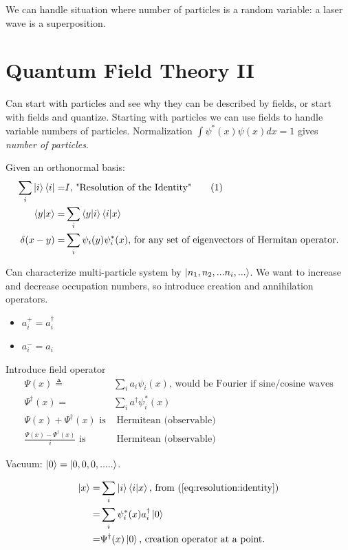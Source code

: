 \documentclass[]{article}
\newcommand\numberthis{\addtocounter{equation}{1}\tag{\theequation}}
\begin{document}
We can handle situation where number of particles is a random variable: a laser wave is a superposition.

\section{Quantum Field Theory II}

Can start with particles and see why they can be described by fields, or start with fields and quantize. Starting with particles we can use fields to handle variable numbers of particles. Normalization $\int \psi^*(x) \psi(x) dx=1$ gives \textit{number of particles}.

Given an orthonormal basis:
\begin{align*}
\sum_{i} \ket{i} \bra{i} =& I \text{, "Resolution of the Identity"}\numberthis \label{eq:resolution:identity}\\
\braket{y|x}=& \sum_{i} \braket{y|i} \braket{i|x}\\
\delta(x-y)=& \sum_{i} \psi_i(y) \psi^*_i(x)\text{, for any set of eigenvectors of Hermitan operator.}
\end{align*}

Can characterize multi-particle system by $\ket{n_1, n_2,...n_i,...}$. We want to increase and decrease occupation numbers, so introduce creation and annihilation operators.

\begin{itemize}
	\item $a^+_i=a^\dagger_i$
	\item $a^-_i=a_i$
\end{itemize} 

Introduce field operator
\begin{align*}
\Psi(x) \triangleq & \sum_{i} a_i \psi_i(x) \text{, would be Fourier if sine/cosine waves}\\
\Psi^\dagger(x) =& \sum_{i} a^\dagger \psi^*_i(x)\\
\Psi(x) + \Psi^\dagger(x) \text{ is}& \text{ Hermitean (observable)}\\
\frac{\Psi(x) - \Psi^\dagger(x)}{i} \text{ is}& \text{ Hermitean (observable)}
\end{align*}

Vacuum: $\ket{0} = \ket{0,0,0,.....}$.

\begin{align*}
\ket{x}=&\sum_{i}\ket{i}\braket{i|x}\text{, from (\ref{eq:resolution:identity})}\\
=& \sum_i \psi^*_i(x)a^\dagger_i\ket{0}\\
=& \Psi^\dagger(x) \ket{0}\text{, creation operator at a point.}
\end{align*} 
\end{document}
